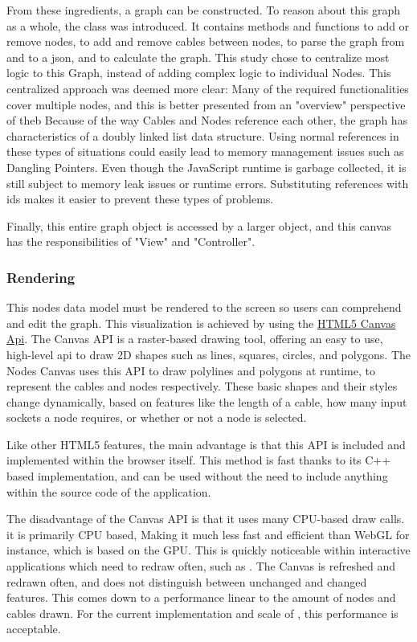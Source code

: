 From these ingredients, a graph can be constructed. 
To reason about this graph as a whole, the  class was introduced. 
It contains methods and functions to add or remove nodes, to add and remove cables between nodes, to parse the graph from and to a json, and to calculate the graph.  
This study chose to centralize most logic to this Graph, instead of adding complex logic to individual Nodes. 
This centralized approach was deemed more clear: Many of the required functionalities cover multiple nodes, and this is better presented from an "overview" perspective of theb 
Because of the way Cables and Nodes reference each other, the graph has characteristics of a doubly linked list data structure. Using normal references in these types of situations could easily lead to memory management issues such as Dangling Pointers. Even though the JavaScript runtime is garbage collected, it is still subject to memory leak issues or runtime errors. Substituting references with ids makes it easier to prevent these types of problems. 

Finally, this entire graph object is accessed by a larger  object, and this canvas has the responsibilities of "View" and "Controller". 

\subsubsection*{ Rendering }
This nodes data model must be rendered to the screen so users can comprehend and edit the graph. 
This visualization is achieved by using the \href{https://developer.mozilla.org/en-US/docs/Web/API/Canvas_API}{HTML5 Canvas Api}. 
The Canvas API is a raster-based drawing tool, offering an easy to use, high-level api to draw 2D shapes such as lines, squares, circles, and polygons. 
The Nodes Canvas uses this API to draw polylines and polygons at runtime, to represent the cables and nodes respectively. 
These basic shapes and their styles change dynamically, based on features like the length of a cable, how many input sockets a node requires, or whether or not a node is selected. 

Like other HTML5 features, the main advantage is that this API is included and implemented within the browser itself. This method is fast thanks to its C++ based implementation, and can be used without the need to include anything within the source code of the application.

The disadvantage of the Canvas API is that it uses many CPU-based draw calls. it is primarily CPU based, Making it much less fast and efficient than WebGL for instance, which is based on the GPU. 
This is quickly noticeable within interactive applications which need to redraw often, such as \geofront. 
The Canvas is refreshed and redrawn often, and does not distinguish between unchanged and changed features. 
This comes down to a performance linear to the amount of nodes and cables drawn. For the current implementation and scale of \geofront, this performance is acceptable. 

